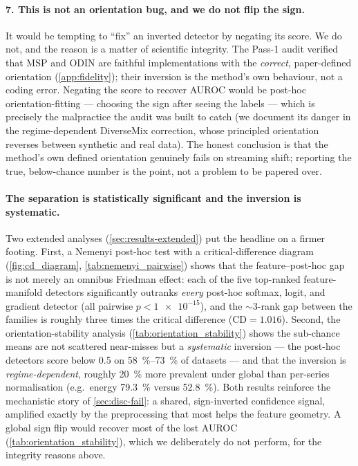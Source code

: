 \paragraph{7. This is not an orientation bug, and we do not flip the sign.}
It would be tempting to ``fix'' an inverted detector by negating its score. We do
not, and the reason is a matter of scientific integrity. The Pass-1 audit verified
that MSP and ODIN are faithful implementations with the \emph{correct},
paper-defined orientation (\cref{app:fidelity}); their inversion is the method's own
behaviour, not a coding error. Negating the score to recover AUROC would be
post-hoc orientation-fitting --- choosing the sign after seeing the labels --- which
is precisely the malpractice the audit was built to catch (we document its danger in
the regime-dependent DiverseMix correction, whose principled orientation reverses
between synthetic and real data). The honest conclusion is that the method's own
defined orientation genuinely fails on streaming shift; reporting the true,
below-chance number is the point, not a problem to be papered over.

\paragraph{The separation is statistically significant and the inversion is
systematic.} Two extended analyses (\cref{sec:results-extended}) put the headline
on a firmer footing. First, a Nemenyi post-hoc test with a critical-difference
diagram (\cref{fig:cd_diagram}, \cref{tab:nemenyi_pairwise}) shows that the
feature--post-hoc gap is not merely an omnibus Friedman effect: each of the five
top-ranked feature-manifold detectors significantly outranks \emph{every} post-hoc
softmax, logit, and gradient detector (all pairwise $p < \num{1e-15}$), and the
$\sim$\num{3}-rank gap between the families is roughly three times the critical
difference (CD${} = \num{1.016}$). Second, the orientation-stability analysis
(\cref{tab:orientation_stability}) shows the sub-chance means are not scattered
near-misses but a \emph{systematic} inversion --- the post-hoc detectors score
below \num{0.5} on \SIrange{58}{73}{\percent} of datasets --- and that the
inversion is \emph{regime-dependent}, roughly \SI{20}{\percent} more prevalent
under global than per-series normalisation (e.g.\ energy \SI{79.3}{\percent} versus
\SI{52.8}{\percent}). Both results reinforce the mechanistic story of
\cref{sec:disc-fail}: a shared, sign-inverted confidence signal, amplified exactly
by the preprocessing that most helps the feature geometry. A global sign flip would
recover most of the lost AUROC (\cref{tab:orientation_stability}), which we
deliberately do not perform, for the integrity reasons above.

